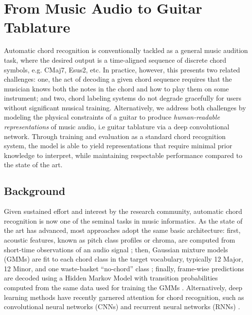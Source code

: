 

\graphicspath{{6/figures/}}

\chapter{From Music Audio to Guitar Tablature}
\label{chp:background}

Automatic chord recognition is conventionally tackled as a general music audition task, where the desired output is a time-aligned sequence of discrete chord symbols, e.g. CMaj7, Esus2, etc.
In practice, however, this presents two related challenges:  one, the act of decoding a given chord sequence requires that the musician knows both the notes in the chord and how to play them on some instrument; and two, chord labeling systems do not degrade gracefully for users without significant musical training.
Alternatively, we address both challenges by modeling the physical constraints of a guitar to produce \emph{human-readable representations} of music audio, i.e guitar tablature via a deep convolutional network.
Through training and evaluation as a standard chord recognition system, the model is able to yield representations that require minimal prior knowledge to interpret, while maintaining respectable performance compared to the state of the art.


\section{Background}
\label{sec:part1}

Given sustained effort and interest by the research community, automatic chord recognition is now one of the seminal tasks in music informatics.
As the state of the art has advanced, most approaches adopt the same basic architecture: first, acoustic features, known as pitch class profiles or chroma, are computed from short-time observations of an audio signal \cite{Fujishima1999}; then, Gaussian mixture models (GMMs) are fit to each chord class in the target vocabulary, typically 12 Major, 12 Minor, and one waste-basket ``no-chord'' class \cite{Bello2005}; finally, frame-wise predictions are decoded using a Hidden Markov Model with transition probabilities computed from the same data used for training the GMMs \cite{Sheh2003}.
Alternatively, deep learning methods have recently garnered attention for chord recognition, such as convolutional neural networks (CNNs)\cite{Humphrey2012} and recurrent neural networks (RNNs) \cite{Boulanger2013}.

